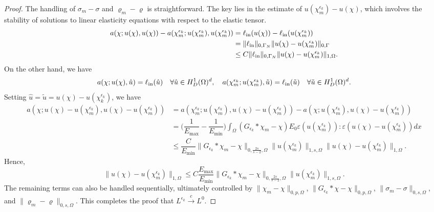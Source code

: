 \documentclass{amsart}
\begin{document}
\begin{proof}
    The handling of \(\sigma_m - \sigma\) and \(\varrho_m - \varrho\) is straightforward. The key lies in the estimate of \(u(\chi_m^{\epsilon_k}) - u(\chi)\), which involves the stability of solutions to linear elasticity equations with respect to the elastic tensor.
    \begin{align*}
        a(\chi;u(\chi),u(\chi))-a(\chi_m^{\epsilon_k};u(\chi_m^{\epsilon_k}),u(\chi_m^{\epsilon_k}))
        &=\ell_{\rm in}(u(\chi))-\ell_{\rm in}(u(\chi_m^{\epsilon_k}))\\
        &=\|\ell_{\rm in}\|_{0,\Gamma_N}\|u(\chi)-u(\chi_m^{\epsilon_k})\|_{0,\Gamma}\\
        &\leq C\|\ell_{\rm in}\|_{0,\Gamma_N}\|u(\chi)-u(\chi_m^{\epsilon_k})\|_{1,\Omega}.
    \end{align*}
    On the other hand, we have
    \begin{align*}
        a(\chi;u(\chi),\hat{u})=\ell_{\rm in}(\hat{u})\quad \forall \hat{u}\in H_D^1(\Omega)^d,\quad 
        a(\chi_m^{\epsilon_k};u(\chi_m^{\epsilon_k}),\tilde{u})=\ell_{\rm in}(\tilde{u})\quad \forall\tilde{u}\in  H_D^1(\Omega)^d.
    \end{align*}
    Setting $\hat{u}=\tilde{u}=u(\chi)-u(\chi_k^{\epsilon_k})$, we have
    \begin{align*}
        a(\chi;u(\chi)-u(\chi_m^{\epsilon_k}),u(\chi)-u(\chi_m^{\epsilon_k}))
    &=a(\chi_m^{\epsilon_k};u(\chi_m^{\epsilon_k}),u(\chi)-u(\chi_m^{\epsilon_k}))-a(\chi;u(\chi_m^{\epsilon_k}),u(\chi)-u(\chi_m^{\epsilon_k}))\\
       & =\Big(\dfrac{1}{E_{\max}}-\dfrac{1}{E_{\min}}\Big)\int_\Omega (G_{\epsilon_k}*\chi_m-\chi)E_0\varepsilon(u(\chi_m^{\epsilon_k})):\varepsilon(u(\chi)-u(\chi_m^{\epsilon_k}))dx\\
        &\leq\dfrac{C}{E_{\min}}\|G_{\epsilon_k}*\chi_m-\chi\|_{0,\frac{2s}{s-2},\Omega}\|u(\chi_m^{\epsilon_k})\|_{1,s,\Omega}\|u(\chi)-u(\chi_m^{\epsilon_k})\|_{1,\Omega}.
    \end{align*}
    Hence, 
    $$\|u(\chi)-u(\chi_m^{\epsilon_k})\|_{1,\Omega}\leq C\dfrac{E_{\max}}{E_{\min}}\|G_{\epsilon_k}*\chi_m-\chi\|_{0,\frac{2s}{s-2},\Omega}\|u(\chi_m^{\epsilon_k})\|_{1,s,\Omega}.$$
    The remaining terms can also be handled sequentially, ultimately controlled by \(\|\chi_m - \chi\|_{0,p,\Omega}\), \(\|G_{\epsilon_k} * \chi - \chi\|_{0,p,\Omega}\), \(\|\sigma_m - \sigma\|_{0,s,\Omega}\), and \(\|\varrho_m - \varrho\|_{0,s,\Omega}\). This completes the proof that \(L^{{\epsilon_k}} \stackrel{c}{\longrightarrow} L^{0}\).
\end{proof}
\end{document}
